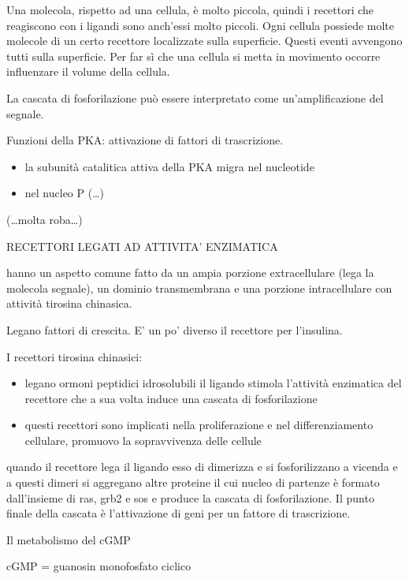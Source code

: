 \documentclass[]{article}
\begin{document}
Una molecola, rispetto ad una cellula, è molto piccola, quindi i
recettori che reagiscono con i ligandi sono anch'essi molto piccoli.
Ogni cellula possiede molte molecole di un certo recettore localizzate
sulla superficie. Questi eventi avvengono tutti sulla superficie. Per
far sì che una cellula si metta in movimento occorre influenzare il
volume della cellula.

La cascata di fosforilazione può essere interpretato come
un'amplificazione del segnale.

Funzioni della PKA: attivazione di fattori di trascrizione.

\begin{itemize}
\itemsep1pt\parskip0pt
\item
  la subunità catalitica attiva della PKA migra nel nucleotide
\item
  nel nucleo P (\ldots{})
\end{itemize}

(\ldots{}molta roba\ldots{})

RECETTORI LEGATI AD ATTIVITA' ENZIMATICA

hanno un aspetto comune fatto da un ampia porzione extracellulare (lega
la molecola segnale), un dominio transmembrana e una porzione
intracellulare con attività tirosina chinasica.

Legano fattori di crescita. E' un po' diverso il recettore per
l'insulina.

I recettori tirosina chinasici:

\begin{itemize}
\itemsep1pt\parskip0pt
\item
  legano ormoni peptidici idrosolubili il ligando stimola l'attività
  enzimatica del recettore che a sua volta induce una cascata di
  fosforilazione
\item
  questi recettori sono implicati nella proliferazione e nel
  differenziamento cellulare, promuovo la sopravvivenza delle cellule
\end{itemize}

quando il recettore lega il ligando esso di dimerizza e si
fosforilizzano a vicenda e a questi dimeri si aggregano altre proteine
il cui nucleo di partenze è formato dall'insieme di ras, grb2 e sos e
produce la cascata di fosforilazione. Il punto finale della cascata è
l'attivazione di geni per un fattore di trascrizione.

Il metabolismo del cGMP

cGMP = guanosin monofosfato ciclico
\end{document}
